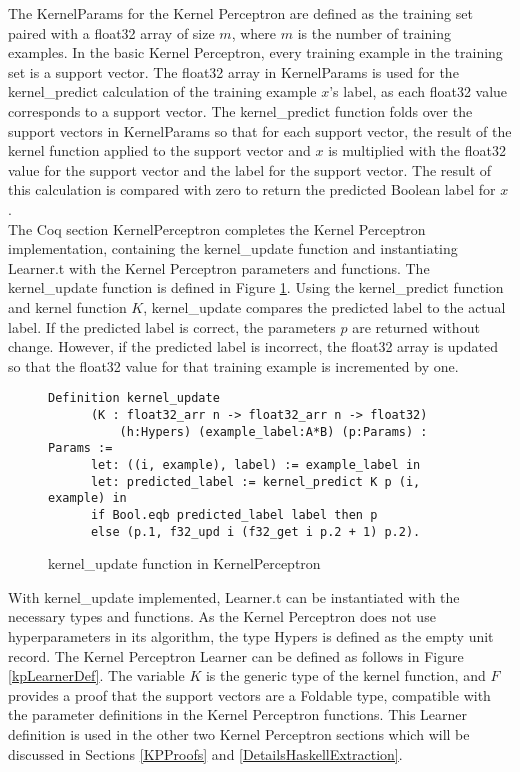 The KernelParams for the Kernel Perceptron are defined as the training set paired with a float32 array of size $m$, where $m$ is the number of training examples. In the basic Kernel Perceptron, every training example in the training set is a support vector. The float32 array in KernelParams is used for the kernel\_predict calculation of the training example $x$'s label, as each float32 value corresponds to a support vector. The kernel\_predict function folds over the support vectors in KernelParams so that for each support vector, the result of the kernel function applied to the support vector and $x$ is multiplied with the float32 value for the support vector and the label for the support vector. The result of this calculation is compared with zero to return the predicted Boolean label for $x$. 
\\The Coq section KernelPerceptron completes the Kernel Perceptron implementation, containing the kernel\_update function and instantiating Learner.t with the Kernel Perceptron parameters and functions. The kernel\_update function is defined in Figure \ref{kernel_updateDef}. Using the kernel\_predict function and kernel function $K$, kernel\_update compares the predicted label to the actual label. If the predicted label is correct, the parameters $p$ are returned without change. However, if the predicted label is incorrect, the float32 array is updated so that the float32 value for that training example is incremented by one. 

\begin{figure}
    \caption{kernel\_update function in KernelPerceptron}
    \label{kernel_updateDef}
    \begin{lstlisting}
Definition kernel_update 
      (K : float32_arr n -> float32_arr n -> float32)
          (h:Hypers) (example_label:A*B) (p:Params) : Params :=
      let: ((i, example), label) := example_label in 
      let: predicted_label := kernel_predict K p (i, example) in
      if Bool.eqb predicted_label label then p
      else (p.1, f32_upd i (f32_get i p.2 + 1) p.2).
    \end{lstlisting}
\end{figure}

With kernel\_update implemented, Learner.t can be instantiated with the necessary types and functions. As the Kernel Perceptron does not use hyperparameters in its algorithm, the type Hypers is defined as the empty unit record. The Kernel Perceptron Learner can be defined as follows in Figure \ref{kpLearnerDef}. The variable $K$ is the generic type of the kernel function, and $F$ provides a proof that the support vectors are a Foldable type, compatible with the parameter definitions in the Kernel Perceptron functions. This Learner definition is used in the other two Kernel Perceptron sections which will be discussed in Sections \ref{KPProofs} and \ref{DetailsHaskellExtraction}.

